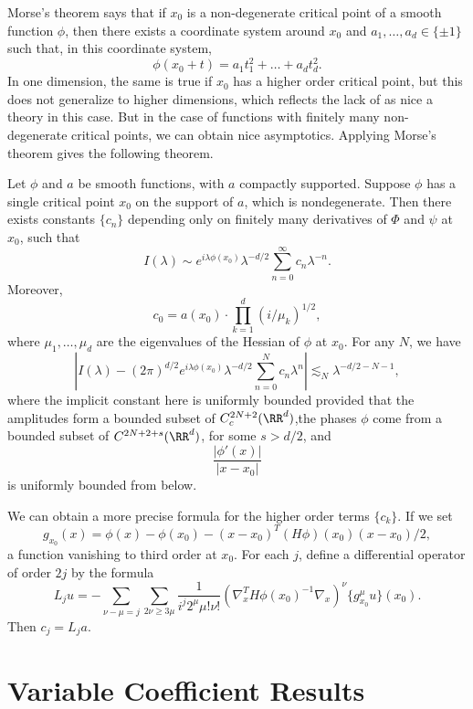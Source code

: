 Morse's theorem says that if $x_0$ is a non-degenerate critical point of a smooth function $\phi$, then there exists a coordinate system around $x_0$ and $a_1, \dots, a_d \in \{ \pm 1 \}$ such that, in this coordinate system,
%
\[ \phi(x_0 + t) = a_1 t_1^2 + \dots + a_d t_d^2. \]
%
In one dimension, the same is true if $x_0$ has a higher order critical point, but this does not generalize to higher dimensions, which reflects the lack of as nice a theory in this case. But in the case of functions with finitely many non-degenerate critical points, we can obtain nice asymptotics. Applying Morse's theorem gives the following theorem.

\begin{theorem}
  Let $\phi$ and $a$ be smooth functions, with $a$ compactly supported. Suppose $\phi$ has a single critical point $x_0$ on the support of $a$, which is nondegenerate. Then there exists constants $\{ c_n \}$ depending only on finitely many derivatives of $\Phi$ and $\psi$ at $x_0$, such that
  \[ I(\lambda) \sim e^{i \lambda \phi(x_0)} \lambda^{-d/2} \sum_{n = 0}^\infty c_n \lambda^{-n}. \]
  Moreover,
  \[ c_0 = a(x_0) \cdot \prod_{k = 1}^d (i/\mu_k)^{1/2}, \]
  where $\mu_1,\dots,\mu_d$ are the eigenvalues of the Hessian of $\phi$ at $x_0$. For any $N$, we have
  \[ \left| I(\lambda) - (2 \pi)^{d/2} e^{i \lambda \phi(x_0)} \lambda^{-d/2} \sum_{n = 0}^N c_n \lambda^n \right| \lesssim_N \lambda^{-d/2-N-1}, \]
  where the implicit constant here is uniformly bounded provided that the amplitudes form a bounded subset of $C_c^{2N+2}(\RR^d)$,the phases $\phi$ come from a bounded subset of $C^{2N+2+s}(\RR^d)$, for some $s > d/2$, and
  \[ \frac{|\phi'(x)|}{|x - x_0|} \]
  is uniformly bounded from below.
\end{theorem}

\begin{remark}
    We can obtain a more precise formula for the higher order terms $\{ c_k \}$. If we set
    \[ g_{x_0}(x) = \phi(x) - \phi(x_0) - (x - x_0)^T (H \phi)(x_0) (x - x_0) / 2, \]
    a function vanishing to third order at $x_0$. For each $j$, define a differential operator of order $2j$ by the formula
    \[ L_j u = - \sum_{\nu - \mu = j} \sum_{2 \nu \geq 3 \mu} \frac{1}{i^j 2^\mu \mu! \nu!} (\nabla^T_x H \phi(x_0)^{-1} \nabla_x)^\nu \{ g^\mu_{x_0} u \} (x_0). \]
    Then $c_j = L_j a$.
\end{remark}

\section{Variable Coefficient Results}


